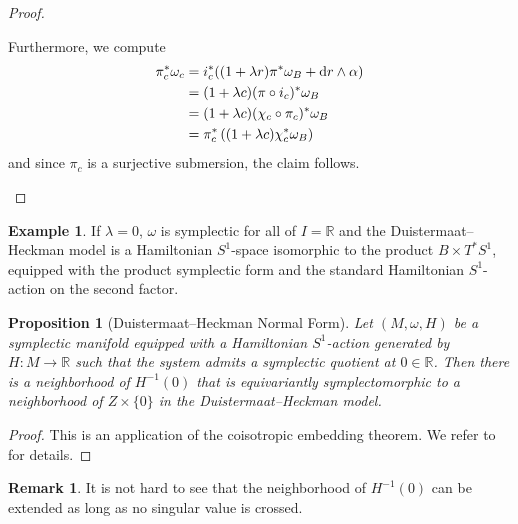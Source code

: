 \documentclass[10pt,oneside,reqno]{amsart}
\newtheorem{proposition}[theorem]{Proposition}
\theoremstyle{definition}
\newtheorem*{remark}{Remark}
\newtheorem{example}[theorem]{Example}
\renewcommand{\dd}{\textup{d}}
\newcommand{\IR}{\mathbb{R}}
\begin{document}
\begin{proof}
\begin{enumerate}
    Furthermore, we compute
    \begin{align*}
        \pi_c^*\omega_c &= i_c^*((1+\lambda r)\pi^*\omega_B+\dd r\wedge\alpha) \\
        &= (1+\lambda c)(\pi\circ i_c)^*\omega_B \\
        &= (1+\lambda c)(\chi_c \circ \pi_c)^*\omega_B \\
        &= \pi_c^*\left( (1+\lambda c)\chi_c^*\omega_B\right)
    \end{align*}
    and since $\pi_c$ is a surjective submersion, the claim follows. \qedhere
    \end{enumerate}
\end{proof}

\begin{example}
      If $\lambda=0$, $\omega$ is symplectic for all of $I=\IR$ and the Duistermaat--Heckman model is a Hamiltonian $S^1$-space isomorphic to the product $B\times T^*S^1$, equipped with the product symplectic form and the standard Hamiltonian $S^1$-action on the second factor.
\end{example}
\begin{proposition}[Duistermaat--Heckman Normal Form] \label{prop:DHNormalForm}
    Let $(M,\omega,H)$ be a symplectic manifold equipped with a Hamiltonian $S^1$-action generated by $H:M\to \IR$ such that the system admits a symplectic quotient at $0\in \IR$. Then there is a neighborhood of $H^{-1}(0)$ that is equivariantly symplectomorphic to a neighborhood of $Z\times \{0\}$ in the Duistermaat--Heckman model. 
\end{proposition}
\begin{proof}
    This is an application of the coisotropic embedding theorem. We refer to \cite[Section 2.1]{guillemin2012moment} for details.
\end{proof}
\begin{remark}
    It is not hard to see that the neighborhood of $H^{-1}(0)$ can be extended as long as no singular value is crossed. 
\end{remark}
\end{document}
